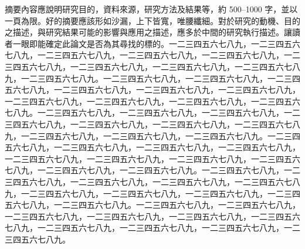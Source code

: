 摘要內容應說明研究目的，資料來源，研究方法及結果等，約 500--1000 字，並以一頁為限。好的摘要應該形如沙漏，上下皆寬，唯腰纖細。對於研究的動機、目的之描述，與研究結果可能的影響與應用之描述，應多於中間的研究執行描述。讓讀者一眼即能確定此論文是否為其尋找的標的。一二三四五六七八九，一二三四五六七八九，一二三四五六七八九，一二三四五六七八九，一二三四五六七八九，一二三四五六七八九，一二三四五六七八九，一二三四五六七八九，一二三四五六七八九，一二三四五六七八九。一二三四五六七八九，一二三四五六七八九，一二三四五六七八九，一二三四五六七八九，一二三四五六七八九，一二三四五六七八九，一二三四五六七八九，一二三四五六七八九，一二三四五六七八九，一二三四五六七八九。一二三四五六七八九，一二三四五六七八九，一二三四五六七八九，一二三四五六七八九，一二三四五六七八九，一二三四五六七八九，一二三四五六七八九，一二三四五六七八九，一二三四五六七八九，一二三四五六七八九。一二三四五六七八九，一二三四五六七八九，一二三四五六七八九，一二三四五六七八九，一二三四五六七八九，一二三四五六七八九，一二三四五六七八九，一二三四五六七八九，一二三四五六七八九，一二三四五六七八九。一二三四五六七八九，一二三四五六七八九，一二三四五六七八九，一二三四五六七八九，一二三四五六七八九，一二三四五六七八九，一二三四五六七八九，一二三四五六七八九，一二三四五六七八九，一二三四五六七八九。一二三四五六七八九，一二三四五六七八九，一二三四五六七八九，一二三四五六七八九，一二三四五六七八九，一二三四五六七八九，一二三四五六七八九，一二三四五六七八九，一二三四五六七八九，一二三四五六七八九。